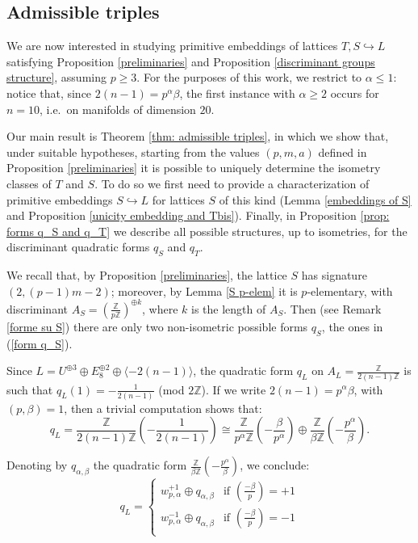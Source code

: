 \documentclass{amsart}
\theoremstyle{definition}
\newcommand{\IZ}{\mathbb{Z}}
\begin{document}
\subsection{Admissible triples}\label{subsection: adm triples}

We are now interested in studying primitive embeddings of lattices $T, S \hookrightarrow L$ satisfying Proposition \ref{preliminaries} and Proposition \ref{discriminant groups structure}, assuming $p \geq 3$. For the purposes of this work, we restrict to $\alpha \leq 1$: notice that, since $2(n-1) = p^\alpha \beta$, the first instance with $\alpha \geq 2$ occurs for $n=10$, i.e.\ on manifolds of dimension $20$.

Our main result is Theorem \ref{thm: admissible triples}, in which we show that, under suitable hypotheses, starting from the values $(p,m,a)$ defined in Proposition \ref{preliminaries} it is possible to uniquely determine the isometry classes of $T$ and $S$. To do so we first need to provide a characterization of primitive embeddings $S \hookrightarrow L$ for lattices $S$ of this kind (Lemma \ref{embeddings of S} and Proposition \ref{unicity embedding and Tbis}). Finally, in Proposition \ref{prop: forms q_S and q_T} we describe all possible structures, up to isometries, for the discriminant quadratic forms $q_S$ and $q_T$.

We recall that, by Proposition \ref{preliminaries}, the lattice $S$ has signature $(2, (p-1)m - 2)$; moreover, by Lemma \ref{S p-elem} it is $p$-elementary, with discriminant $A_S = \left( \frac{\IZ}{p \IZ}\right)^{\oplus k}$, where $k$ is the length of $A_S$. Then (see Remark \ref{forme su S}) there are only two non-isometric possible forms $q_S$, the ones in (\ref{form q_S}).

Since $L=U^{\oplus 3}\oplus E_8^{\oplus 2} \oplus \langle-2(n-1)\rangle$, the quadratic form $q_L$ on $A_L = \frac{\IZ}{2(n-1)\IZ}$ is such that $q_L(1) = -\frac{1}{2(n-1)}$ (mod $2\IZ$). If we write $2(n-1)=p^\alpha \beta$, with $(p, \beta)=1$, then a trivial computation shows that:
\[ q_L = \frac{\IZ}{2(n-1)\IZ}\left( -\frac{1}{2(n-1)} \right) \cong \frac{\IZ}{p^\alpha\IZ} \left( -\frac{\beta}{p^\alpha} \right) \oplus \frac{\IZ}{\beta \IZ} \left( -\frac{p^\alpha}{\beta} \right)  .\]

Denoting by $q_{\alpha, \beta}$ the quadratic form $\frac{\IZ}{\beta \IZ}\left(-\frac{p^\alpha}{\beta}\right)$, we conclude:
\begin{equation}\label{form q_L}
q_L = \begin{cases}
w^{+1}_{p,\alpha} \oplus q_{\alpha, \beta} & \text{if } \left( \frac{-\beta}{p} \right) = +1\\
w^{-1}_{p,\alpha} \oplus q_{\alpha, \beta} & \text{if } \left( \frac{-\beta}{p} \right) = -1\\
\end{cases}
\end{equation} 
\end{document}
